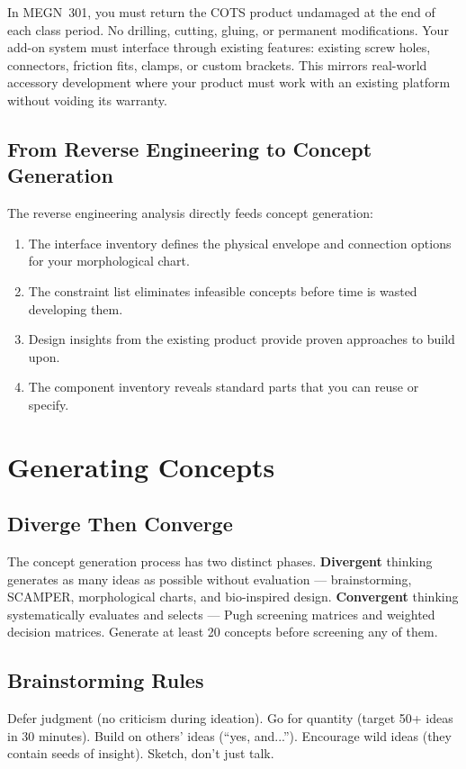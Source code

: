 \documentclass[11pt,letterpaper,twoside,openany]{book}
\begin{document}
\begin{tipbox}
In MEGN~301, you must return the COTS product undamaged at the end of each class period. No drilling, cutting, gluing, or permanent modifications. Your add-on system must interface through existing features: existing screw holes, connectors, friction fits, clamps, or custom brackets. This mirrors real-world accessory development where your product must work with an existing platform without voiding its warranty.
\end{tipbox}

\subsection{From Reverse Engineering to Concept Generation}
The reverse engineering analysis directly feeds concept generation:
\begin{enumerate}[nosep,leftmargin=1.5em]
\item The interface inventory defines the physical envelope and connection options for your morphological chart.
\item The constraint list eliminates infeasible concepts before time is wasted developing them.
\item Design insights from the existing product provide proven approaches to build upon.
\item The component inventory reveals standard parts that you can reuse or specify.
\end{enumerate}


\section{Generating Concepts}
\subsection{Diverge Then Converge}
The concept generation process has two distinct phases. \textbf{Divergent} thinking generates as many ideas as possible without evaluation — brainstorming, SCAMPER, morphological charts, and bio-inspired design. \textbf{Convergent} thinking systematically evaluates and selects — Pugh screening matrices and weighted decision matrices. Generate at least 20 concepts before screening any of them.

\subsection{Brainstorming Rules}
Defer judgment (no criticism during ideation). Go for quantity (target 50+ ideas in 30 minutes). Build on others' ideas (``yes, and...''). Encourage wild ideas (they contain seeds of insight). Sketch, don't just talk.
\end{document}
